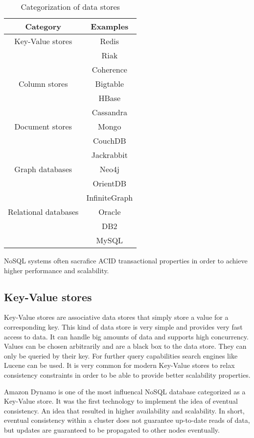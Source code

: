 \documentclass{sig-alternate}
\begin{document}
\begin{table}
\centering
\caption{Categorization of data stores}
\begin{tabular}{|c|c|} \hline
Category             & Examples\\
\hline
Key-Value stores     & Redis\\ 
 					 & Riak\\ 
 					 & Coherence\\
\hline
Column stores        & Bigtable\\ 
 					 & HBase\\ 
 					 & Cassandra\\
\hline
Document stores      & Mongo\\ 
 					 & CouchDB\\ 
 					 & Jackrabbit\\
\hline
Graph databases      & Neo4j\\ 
 					 & OrientDB\\ 
 					 & InfiniteGraph\\
\hline
Relational databases & Oracle\\ 
 					 & DB2\\ 
 					 & MySQL\\
\hline\end{tabular}
\end{table}

NoSQL systems often sacrafice ACID transactional properties in order to achieve higher performance and scalability. 

\subsection{Key-Value stores}

Key-Value stores are associative data stores that simply store a value for a corresponding key. This kind of data store is very simple and provides very fast access to data. It can handle big amounts of data and supports high concurrency. Values can be chosen arbitrarily and are a black box to the data store. They can only be queried by their key. For further query capabilities search engines like Lucene can be used.
It is very common for modern Key-Value stores to relax consistency constraints in order to be able to provide better scalability properties.

Amazon Dynamo is one of the most influencal NoSQL database categorized as a Key-Value store. It was the first technology to implement the idea of eventual consistency. An idea that resulted in higher availability and scalability. In short, eventual consistency within a cluster does not guarantee up-to-date reads of data, but updates are guaranteed to be propagated to other nodes eventually.
\end{document}
